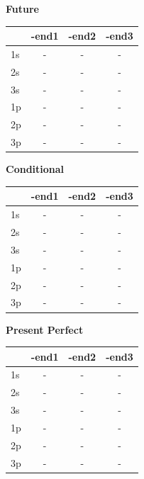 \documentclass{book}
\begin{document}
\vspace{0.5cm}
\noindent
\begin{minipage}{0.32\textwidth}
\centering
\textbf{Future} \\ \vspace{0.1cm}
\begin{tabular}{lccc} \toprule & -end1 & -end2 & -end3 \\ \midrule 1s & - & - & - \\ 2s & - & - & - \\ 3s & - & - & - \\ 1p & - & - & - \\ 2p & - & - & - \\ 3p & - & - & - \\ \bottomrule \end{tabular}
\end{minipage}\hfill
\begin{minipage}{0.32\textwidth}
\centering
\textbf{Conditional} \\ \vspace{0.1cm}
\begin{tabular}{lccc} \toprule & -end1 & -end2 & -end3 \\ \midrule 1s & - & - & - \\ 2s & - & - & - \\ 3s & - & - & - \\ 1p & - & - & - \\ 2p & - & - & - \\ 3p & - & - & - \\ \bottomrule \end{tabular}
\end{minipage}\hfill
\begin{minipage}{0.32\textwidth}
\centering
\textbf{Present Perfect} \\ \vspace{0.1cm}
\begin{tabular}{lccc} \toprule & -end1 & -end2 & -end3 \\ \midrule 1s & - & - & - \\ 2s & - & - & - \\ 3s & - & - & - \\ 1p & - & - & - \\ 2p & - & - & - \\ 3p & - & - & - \\ \bottomrule \end{tabular}
\end{minipage}
\end{document}
